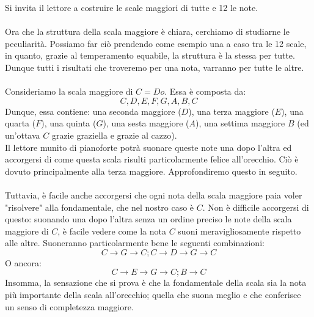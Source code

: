 \documentclass[12pt,a4paper]{book}
\theoremstyle{definition}
\theoremstyle{Theorem}
\theoremstyle{definition}
\theoremstyle{definition}
\theoremstyle{definition}
\begin{document}
	 		 Si invita il lettore a costruire le scale maggiori di tutte e 12 le note.\\
	 		 \\
	 		 Ora che la struttura della scala maggiore è chiara, cerchiamo di studiarne le peculiarità. Possiamo far ciò prendendo come esempio una a caso tra le 12 scale, in quanto, grazie al temperamento equabile, la struttura è la stessa per tutte. Dunque tutti i risultati che troveremo per una nota, varranno per tutte le altre.\\
	 		 \\
	 		 Consideriamo la scala maggiore di $C=Do$. Essa è composta da:
	 		 $$C,D,E,F,G,A,B,C$$
	 		 Dunque, essa contiene: una seconda maggiore ($D$), una terza maggiore ($E$), una quarta ($F$), una quinta ($G$), una sesta maggiore ($A$), una settima maggiore $B$ (ed un'ottava $C$ grazie graziella e grazie al cazzo).\\
	 		 Il lettore munito di pianoforte potrà suonare queste note una dopo l'altra ed accorgersi di come questa scala risulti particolarmente felice all'orecchio. Ciò è dovuto principalmente alla terza maggiore. Approfondiremo questo in seguito.\\
	 		 \\
	 		 Tuttavia, è facile anche accorgersi che ogni nota della scala maggiore paia voler "risolvere" alla fondamentale, che nel nostro caso è $C$. Non è difficile accorgersi di questo: suonando una dopo l'altra senza un ordine preciso le note della scala maggiore di $C$, è facile vedere come la nota $C$ suoni meravigliosamente rispetto alle altre. Suoneranno particolarmente bene le seguenti combinazioni:
	 		 $$C\rightarrow G\rightarrow C;C\rightarrow D\rightarrow G\rightarrow C$$
	 		 O ancora:
	 		 $$C\rightarrow E\rightarrow G\rightarrow C;B\rightarrow C$$
	 		 Insomma, la sensazione che si prova è che la fondamentale della scala sia la nota più importante della scala all'orecchio; quella che suona meglio e che conferisce un senso di completezza maggiore.
\end{document}
